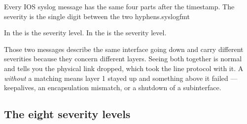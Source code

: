 {}%
{Every IOS syslog message has the same four parts after the timestamp. The
severity is the single digit between the two hyphens.}{syslogfmt}

\begin{alertbox}
In  the  is the severity level. In
 the  is the severity level.

Those two messages describe the same interface going down and carry different
severities because they concern different layers. Seeing both together is normal
and tells you the physical link dropped, which took the line protocol with it. A
 \emph{without} a matching  means
layer 1 stayed up and something above it failed --- keepalives, an encapsulation
mismatch, or a shutdown of a subinterface.
\end{alertbox}

\subsection{The eight severity levels}

